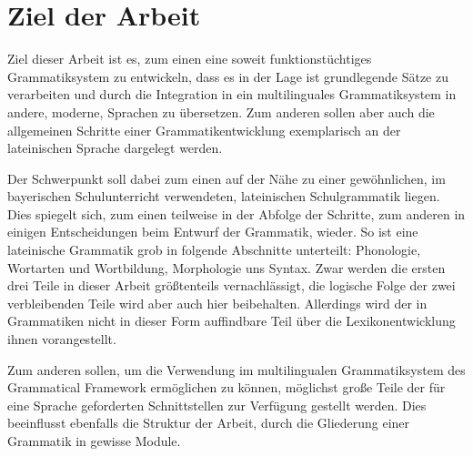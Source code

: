 \documentclass[fontsize=12pt,abstract=on,titlepage,bibliography=totoc,ngerman,listof=totoc]{scrreprt}
\begin{document}
\section{Ziel der Arbeit}
\label{sec:ziel}
Ziel dieser Arbeit ist es, zum einen eine soweit funktionstüchtiges Grammatiksystem zu entwickeln, dass es in der Lage ist grundlegende Sätze zu verarbeiten und durch die Integration in ein multilinguales Grammatiksystem in andere, moderne, Sprachen zu übersetzen. Zum anderen sollen aber auch die allgemeinen Schritte einer Grammatikentwicklung exemplarisch an der lateinischen Sprache dargelegt werden. \par
Der Schwerpunkt soll dabei zum einen auf der Nähe zu einer gewöhnlichen, im bayerischen Schulunterricht verwendeten, lateinischen Schulgrammatik liegen. Dies spiegelt sich, zum einen teilweise in der Abfolge der Schritte, zum anderen in einigen Entscheidungen beim Entwurf der Grammatik, wieder. So ist eine lateinische Grammatik grob in folgende Abschnitte unterteilt: Phonologie, Wortarten und Wortbildung, Morphologie uns Syntax. Zwar werden die ersten drei Teile in dieser Arbeit größtenteils vernachlässigt, die logische Folge der zwei verbleibenden Teile wird aber auch hier beibehalten. Allerdings wird der in Grammatiken nicht in dieser Form auffindbare Teil über die Lexikonentwicklung ihnen vorangestellt. \par
Zum anderen sollen, um die Verwendung im multilingualen Grammatiksystem des Grammatical Framework ermöglichen zu können, möglichst große Teile der für eine Sprache geforderten Schnittstellen zur Verfügung gestellt werden. Dies beeinflusst ebenfalls die Struktur der Arbeit, durch die Gliederung einer Grammatik in gewisse Module. 
\pagebreak
\end{document}
